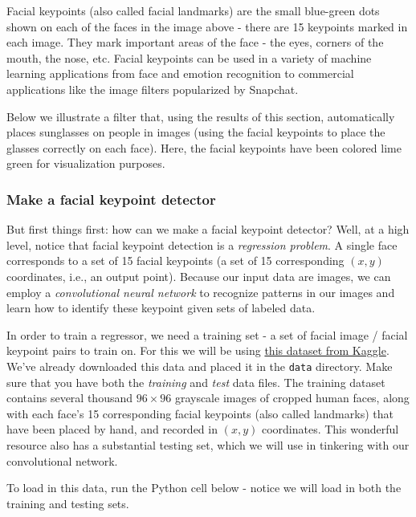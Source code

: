 \documentclass[11pt]{article}
\begin{document}
Facial keypoints (also called facial landmarks) are the small blue-green
dots shown on each of the faces in the image above - there are 15
keypoints marked in each image. They mark important areas of the face -
the eyes, corners of the mouth, the nose, etc. Facial keypoints can be
used in a variety of machine learning applications from face and emotion
recognition to commercial applications like the image filters
popularized by Snapchat.

Below we illustrate a filter that, using the results of this section,
automatically places sunglasses on people in images (using the facial
keypoints to place the glasses correctly on each face). Here, the facial
keypoints have been colored lime green for visualization purposes.

    \hypertarget{make-a-facial-keypoint-detector}{%
\subsubsection{Make a facial keypoint
detector}\label{make-a-facial-keypoint-detector}}

But first things first: how can we make a facial keypoint detector?
Well, at a high level, notice that facial keypoint detection is a
\emph{regression problem}. A single face corresponds to a set of 15
facial keypoints (a set of 15 corresponding \((x, y)\) coordinates,
i.e., an output point). Because our input data are images, we can employ
a \emph{convolutional neural network} to recognize patterns in our
images and learn how to identify these keypoint given sets of labeled
data.

In order to train a regressor, we need a training set - a set of facial
image / facial keypoint pairs to train on. For this we will be using
\href{https://www.kaggle.com/c/facial-keypoints-detection/data}{this
dataset from Kaggle}. We've already downloaded this data and placed it
in the \texttt{data} directory. Make sure that you have both the
\emph{training} and \emph{test} data files. The training dataset
contains several thousand \(96 \times 96\) grayscale images of cropped
human faces, along with each face's 15 corresponding facial keypoints
(also called landmarks) that have been placed by hand, and recorded in
\((x, y)\) coordinates. This wonderful resource also has a substantial
testing set, which we will use in tinkering with our convolutional
network.

To load in this data, run the Python cell below - notice we will load in
both the training and testing sets.
\end{document}
